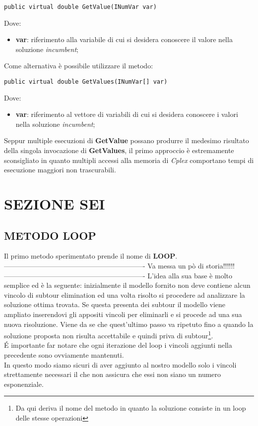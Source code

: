 \documentclass[11pt]{article}
\begin{document}
\begin{lstlisting}
public virtual double GetValue(INumVar var)
\end{lstlisting}

Dove:

\begin{itemize}
\item \textbf{var}: riferimento alla variabile di cui si desidera conoscere il valore nella soluzione \textit{incumbent};
\end{itemize}

Come alternativa è possibile utilizzare il metodo:

\begin{lstlisting}
public virtual double GetValues(INumVar[] var)
\end{lstlisting}

Dove:

\begin{itemize}
    \item \textbf{var}: riferimento al vettore di variabili di cui si desidera conoscere i valori nella soluzione \textit{incumbent};
\end{itemize}

Seppur multiple esecuzioni di \textbf{GetValue} possano produrre il medesimo risultato della singola invocazione di \textbf{GetValues}, il primo approccio è estremamente sconsigliato in quanto multipli accessi alla memoria di \textit{Cplex} comportano tempi di esecuzione maggiori non trascurabili.

\newpage

\section*{SEZIONE SEI}
\label{sec:SezioneSeiS}

\subsection*{METODO LOOP}
\label{sec:MetodoLoopS}

Il primo metodo sperimentato prende il nome di \textbf{LOOP}.
-------------------------------------------------------------
Va messa un pò di storia!!!!!!
-------------------------------------------------------------
L'idea alla sua base è molto semplice ed è la seguente: inizialmente il modello fornito non deve contiene alcun vincolo di subtour elimination ed una volta risolto si procedere ad analizzare la soluzione ottima trovata. Se questa presenta dei subtour il modello viene ampliato inserendovi gli appositi vincoli per eliminarli e si procede ad una sua nuova risoluzione. Viene da se che quest'ultimo passo va ripetuto fino a quando la soluzione proposta non risulta accettabile e quindi priva di subtour\footnote{Da qui deriva il nome del metodo in quanto la soluzione consiste in un loop delle stesse operazioni}.\\\'E importante far notare che ogni iterazione del loop i vincoli aggiunti nella precedente sono ovviamente mantenuti.\\
In questo modo siamo sicuri di aver aggiunto al nostro modello solo i vincoli strettamente necessari il che non assicura che essi non siano un numero esponenziale.\\
\end{document}
